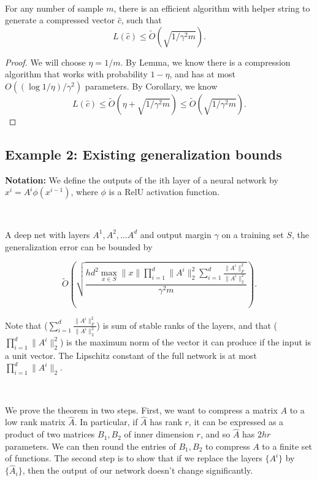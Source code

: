 \

\begin{lemma} For any number of sample $m$, there is an efficient algorithm with helper string to generate a compressed vector $\hat{c}$, such that 
\begin{equation}
L(\hat{c}) \le \tilde{O}(\sqrt{1/\gamma^2 m}).
\end{equation}

\end{lemma}

\begin{proof}
We will choose $\eta = 1/m$. By Lemma, we know there is a compression algorithm that works with probability $1-\eta$, and has at most $O((\log 1/\eta)/\gamma^2)$ parameters. By Corollary, we know
$$
L(\hat{c}) \le \tilde{O}(\eta + \sqrt{1/\gamma^2m}) \le \tilde{O}(\sqrt{1/\gamma^2 m}).
$$
\end{proof}


\subsection{Example 2: Existing generalization bounds}

\textbf{Notation:} We define the outputs of the ith layer of a neural network by $x^{i}=A^{i} \phi (x^{i-1})$, where $\phi$ is a RelU activation function. 

\

\begin{theorem} A deep net with layers $A^1, A^2, \ldots A^d$ 
and output margin $\gamma$ on a training set $S$, the generalization error can be bounded by


\begin{equation}
\tilde{O}\left(\sqrt{\frac{hd^2\max_{x\in S}\|x\| \prod_{i=1}^{d} \|A^i\|_2^2 \sum_{i=1}^d \frac{\|A^i\|_F^2}{\|A^i\|_2^2}}{\gamma^2m}}\right).
\end{equation}

\end{theorem}



Note that ($\sum_{i=1}^d \frac{\|A^i\|_F^2}{\|A^i\|_2^2}$) is  sum of stable ranks of the layers, and that ($\prod_{i=1}^{d} \|A^i\|_2^2$) is the maximum norm of the vector it can produce if the input is a unit vector. The Lipschitz constant of the full network is at most $\prod_{i=1}^d \|A^i\|_2.$ 

\ 

We prove the theorem in two steps. First, we want to compress a matrix $A$ to a low rank matrix $\hat{A}$. In particular, if $\hat{A}$ has rank $r$, it can be expressed as a product of two matrices $B_1,B_2$ of inner dimension $r$, and so $\hat{A}$ has $2hr$ parameters. We can then round the entries of $B_1,B_2$ to compress $A$ to a finite set of functions. The second step is to show that if we replace the layers $\{A^{i}\}$ by $\{\hat{A}_{i}\}$, then the output of our network doesn't change significantly. 

